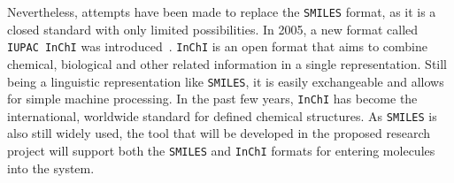 Nevertheless, attempts have been made to replace the \verb|SMILES| format, as it is a closed standard with only limited possibilities. In 2005, a new format called \verb|IUPAC InChI| was introduced~\cite{heller2013inchi}. \verb|InChI| is an open format that aims to combine chemical, biological and other related information in a single representation. Still being a linguistic representation like \verb|SMILES|, it is easily exchangeable and allows for simple machine processing. In the past few years, \verb|InChI| has become the international, worldwide standard for defined chemical structures. As \verb|SMILES| is also still widely used, the tool that will be developed in the proposed research project will support both the \verb|SMILES| and \verb|InChI| formats for entering molecules into the system.
